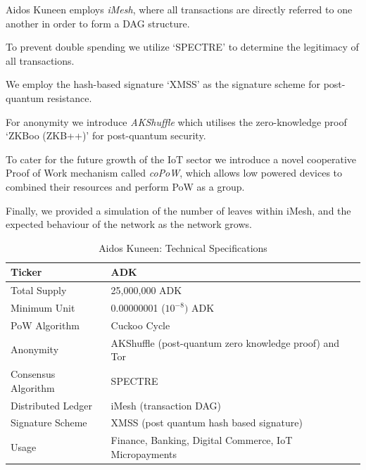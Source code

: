 \documentclass[a4paper,10pt,twocolumn]{article}
\begin{document}
	Aidos Kuneen employs \emph{iMesh}, where all transactions are directly referred to one another in order to form a DAG structure.
	
	\vspace{2.5mm}
	
	To prevent double spending we utilize `SPECTRE' to determine the legitimacy of all transactions.
	
	\vspace{2.5mm}
	
	We employ the hash-based signature `XMSS' as the signature scheme for post-quantum resistance.
	
	\vspace{2.5mm}
	For anonymity we introduce \emph{AKShuffle} which utilises the zero-knowledge proof `ZKBoo (ZKB++)' for post-quantum security.
	
	\vspace{2.5mm}
	
	To cater for the future growth of the IoT sector we introduce a novel cooperative Proof of Work mechanism called \emph{coPoW}, which allows low powered devices to combined their resources and perform PoW as a group.
	
	\vspace{2.5mm}
	
	Finally, we provided a simulation of the number of leaves within iMesh, and the expected behaviour of the network as the network grows.
	
	\vspace{3cm}
	\begin{table}[htb]
		\caption{Aidos Kuneen: Technical Specifications}
		\label{tbl:spec}
		\begin{tabularx}{\linewidth}{XX} 
			\toprule
			Ticker & ADK \\
			\midrule
	Total Supply & 25,000,000 ADK \\ 
	\midrule
	Minimum Unit & 0.00000001 (\(10^{-8})\) ADK \\ 
	\midrule
	PoW Algorithm & Cuckoo Cycle\\ 
	\midrule
	Anonymity & AKShuffle (post-quantum zero knowledge proof) and Tor \\
	\midrule
	Consensus Algorithm & SPECTRE \\ \midrule
	Distributed Ledger & iMesh (transaction DAG) \\
	\midrule
	Signature Scheme & XMSS (post quantum hash based signature)\\ 
	\midrule
	Usage &  Finance, Banking, Digital Commerce, IoT Micropayments \\ 
	\bottomrule
	\end{tabularx}
	  \end{table}
	
\end{document}
